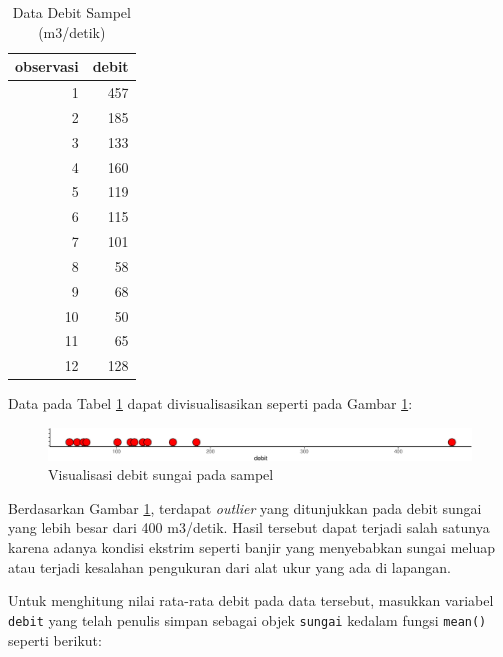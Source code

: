 \documentclass[]{book}
\newenvironment{Shaded}{\begin{snugshade}}{\end{snugshade}}
\newcommand{\KeywordTok}[1]{\textcolor[rgb]{0.13,0.29,0.53}{\textbf{#1}}}
\newcommand{\OperatorTok}[1]{\textcolor[rgb]{0.81,0.36,0.00}{\textbf{#1}}}
\newcommand{\NormalTok}[1]{#1}
\begin{document}
\begin{table}[t]

\caption{\label{tab:debitsungai}Data Debit Sampel (m3/detik)}
\centering
\begin{tabular}{r|r}
\hline
observasi & debit\\
\hline
1 & 457\\
\hline
2 & 185\\
\hline
3 & 133\\
\hline
4 & 160\\
\hline
5 & 119\\
\hline
6 & 115\\
\hline
7 & 101\\
\hline
8 & 58\\
\hline
9 & 68\\
\hline
10 & 50\\
\hline
11 & 65\\
\hline
12 & 128\\
\hline
\end{tabular}
\end{table}

Data pada Tabel \ref{tab:debitsungai} dapat divisualisasikan seperti
pada Gambar \ref{fig:debitvis}:

\begin{figure}

{\centering \includegraphics[width=0.7\linewidth]{EnvStat_files/figure-latex/debitvis-1} 

}

\caption{Visualisasi debit sungai pada sampel}\label{fig:debitvis}
\end{figure}

Berdasarkan Gambar \ref{fig:debitvis}, terdapat \emph{outlier} yang
ditunjukkan pada debit sungai yang lebih besar dari 400 m3/detik. Hasil
tersebut dapat terjadi salah satunya karena adanya kondisi ekstrim
seperti banjir yang menyebabkan sungai meluap atau terjadi kesalahan
pengukuran dari alat ukur yang ada di lapangan.

Untuk menghitung nilai rata-rata debit pada data tersebut, masukkan
variabel \texttt{debit} yang telah penulis simpan sebagai objek
\texttt{sungai} kedalam fungsi \texttt{mean()} seperti berikut:

\begin{Shaded}
\end{Shaded}
\end{document}

